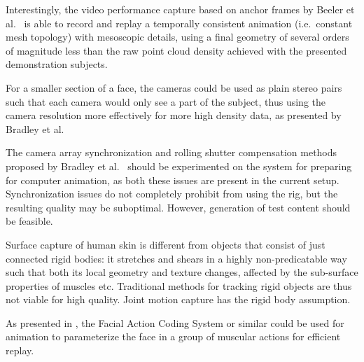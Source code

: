 Interestingly, the video performance capture based on anchor frames by Beeler et al.\ \cite{beeler2011high} is able to record and replay a temporally consistent animation (i.e.\ constant mesh topology) with mesoscopic details, using a final geometry of several orders of magnitude less than the raw point cloud density achieved with the presented demonstration subjects.

For a smaller section of a face, the cameras could be used as plain stereo pairs such that each camera would only see a part of the subject, thus using the camera resolution more effectively for more high density data, as presented by Bradley et al.\ \cite{bradley2010high}

The camera array synchronization and rolling shutter compensation methods proposed by Bradley et al.\ \cite{bradley2009synchronization} should be experimented on the system for preparing for computer animation, as both these issues are present in the current setup.
Synchronization issues do not completely prohibit from using the rig, but the resulting quality may be suboptimal.
However, generation of test content should be feasible.


Surface capture of human skin is different from objects that consist of just connected rigid bodies: it stretches and shears in a highly non-predicatable way such that both its local geometry and texture changes, affected by the sub-surface properties of muscles etc.
Traditional methods for tracking rigid objects are thus not viable for high quality.
Joint motion capture has the rigid body assumption.

As presented in \cite{deng2007computer}, the Facial Action Coding System or similar could be used for animation to parameterize the face in a group of muscular actions for efficient replay.

